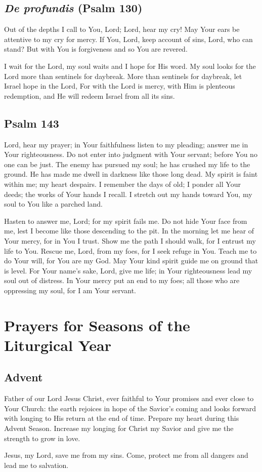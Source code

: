 \documentclass[12pt]{article}
\newcommand{\prayersection}[1]{\section{#1}}
\newcommand{\prayertitle}[1]{\subsection{#1}}
\newcommand{\indulgencedprayertitle}[1]{\prayertitle{#1 \protect\kreuz}}
\newcommand{\foreign}[1]{\textsl{#1}}
\begin{document}
\indulgencedprayertitle{\foreign{De profundis} (Psalm 130)}
Out of the depths I call to You, Lord;
Lord, hear my cry!
May Your ears be attentive to my cry for mercy.
If You, Lord, keep account of sins, Lord, who can stand?
But with You is forgiveness and so You are revered.

I wait for the Lord, my soul waits and I hope for His word.
My soul looks for the Lord more than sentinels for daybreak.
More than sentinels for daybreak, let Israel hope in the Lord,
For with the Lord is mercy, with Him is plenteous redemption, and He will redeem Israel from all its sins.

\indulgencedprayertitle{Psalm 143}
Lord, hear my prayer;
in Your faithfulness listen to my pleading;
answer me in Your righteousness.
Do not enter into judgment with Your servant;
before You no one can be just.
The enemy has pursued my soul;
he has crushed my life to the ground.
He has made me dwell in darkness like those long dead.
My spirit is faint within me;
my heart despairs.
I remember the days of old;
I ponder all Your deeds;
the works of Your hands I recall.
I stretch out my hands toward You, my soul to You like a parched land.

Hasten to answer me, Lord;
for my spirit fails me.
Do not hide Your face from me,
lest I become like those descending to the pit.
In the morning let me hear of Your mercy, for in You I trust.
Show me the path I should walk, for I entrust my life to You.
Rescue me, Lord, from my foes, for I seek refuge in You.
Teach me to do Your will, for You are my God.
May Your kind spirit guide me on ground that is level.
For Your name’s sake, Lord, give me life;
in Your righteousness lead my soul out of distress.
In Your mercy put an end to my foes;
all those who are oppressing my soul, for I am Your servant.


\newpage

\prayersection{Prayers for Seasons of the Liturgical Year}
\prayertitle{Advent}
Father of our Lord Jesus Christ, ever faithful to Your promises and ever close to Your Church: the earth rejoices in hope of the Savior's coming and looks forward with longing to His return at the end of time.
Prepare my heart during this Advent Season.
Increase my longing for Christ my Savior and give me the strength to grow in love.

Jesus, my Lord, save me from my sins.
Come, protect me from all dangers and lead me to salvation.
\end{document}
